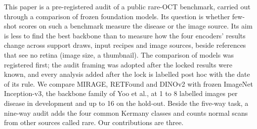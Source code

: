 \documentclass[conference]{IEEEtran}
\begin{document}
This paper is a pre-registered audit of a public rare-OCT benchmark, carried out through a comparison of frozen foundation models. Its question is whether few-shot scores on such a benchmark measure the disease or the image source.
Its aim is less to find the best backbone than to measure how the four encoders' results change across support draws, input recipes and image sources, beside references that see no retina (image size, a thumbnail). The comparison of models was registered first; the audit framing was adopted after the locked results were known, and every analysis added after the lock is labelled post hoc with the date of its rule.
We compare MIRAGE, RETFound and DINOv2 with frozen ImageNet Inception-v3, the backbone family of Yoo et al., at 1 to 8 labelled images per disease in development and up to 16 on the hold-out. Beside the five-way task, a nine-way audit adds the four common Kermany classes \cite{Kermany2018} and counts normal scans from other sources called rare. Our contributions are three.
\end{document}
